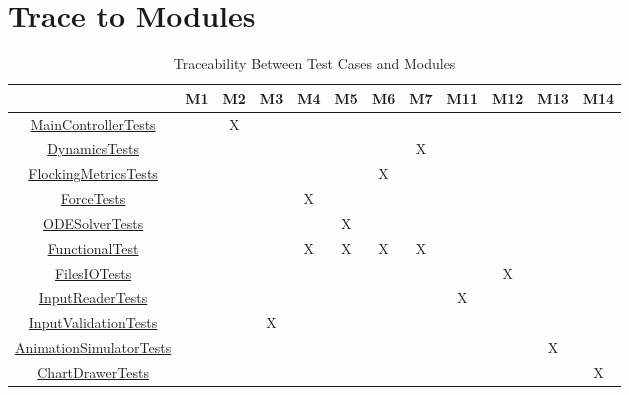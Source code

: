 \documentclass[12pt, titlepage]{article}
\begin{document}

\section{Trace to Modules}		

\begin{table}[h!]
\caption{Traceability Between Test Cases and Modules} \label{tblTraceToModule} 
\centering
\begin{tabular}{|c|c|c|c|c|c|c|c|c|c|c|c|}
\hline
	& M1 & M2 & M3 & M4 & M5 & M6 & M7 & M11 & M12 & M13 & M14 \\
\hline
\href{https://github.com/Mei0725/FlockingSimulator/blob/main/src/Assets/Tests/MainControllerTests.cs}{MainControllerTests}
& &X& & & & & & & & &\\ \hline
\href{https://github.com/Mei0725/FlockingSimulator/blob/main/src/Assets/Tests/FlockingCalculator/DynamicsTests.cs}{DynamicsTests}
& & & & & & &X& & & &\\ \hline
\href{https://github.com/Mei0725/FlockingSimulator/blob/main/src/Assets/Tests/FlockingCalculator/FlockingMetricsTests.cs}{FlockingMetricsTests}
& & & & & &X& & & & &\\ \hline
\href{https://github.com/Mei0725/FlockingSimulator/blob/main/src/Assets/Tests/FlockingCalculator/ForceTests.cs}{ForceTests}
& & & &X& & & & & & &\\ \hline
\href{https://github.com/Mei0725/FlockingSimulator/blob/main/src/Assets/Tests/FlockingCalculator/ODESolverTests.cs}{ODESolverTests}
& & & & &X& & & & & &\\ \hline
\href{https://github.com/Mei0725/FlockingSimulator/blob/main/src/Assets/Tests/FunctionalTest/FunctionalTest.cs}{FunctionalTest}
& & & &X&X&X&X& & & &\\ \hline
\href{https://github.com/Mei0725/FlockingSimulator/blob/main/src/Assets/Tests/IO/FilesIOTests.cs}{FilesIOTests}
& & & & & & & & &X& &\\ \hline
\href{https://github.com/Mei0725/FlockingSimulator/blob/main/src/Assets/Tests/IO/InputReaderTests.cs}{InputReaderTests}
& & & & & & & &X& & &\\ \hline
\href{https://github.com/Mei0725/FlockingSimulator/blob/main/src/Assets/Tests/IO/InputValidationTests.cs}{InputValidationTests}
& & &X& & & & & & & &\\ \hline
\href{https://github.com/Mei0725/FlockingSimulator/blob/main/src/Assets/Tests/Visualization/AnimationSimulatorTests.cs}{AnimationSimulatorTests}
& & & & & & & & & &X&\\ \hline
\href{https://github.com/Mei0725/FlockingSimulator/blob/main/src/Assets/Tests/Visualization/ChartDrawerTests.cs}{ChartDrawerTests}
& & & & & & & & & & &X\\ \hline
\end{tabular}
\end{table}
\end{document}
